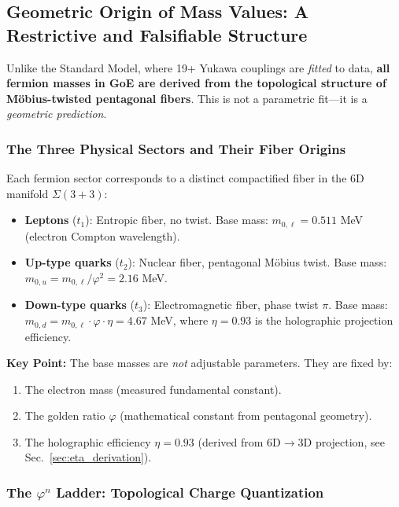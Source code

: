 \documentclass[12pt]{article}
\begin{document}
\subsection{Geometric Origin of Mass Values: A Restrictive and Falsifiable Structure}
\label{sec:geometric_origin}

Unlike the Standard Model, where 19+ Yukawa couplings are \textit{fitted} to data, \textbf{all fermion masses in GoE are derived from the topological structure of M\"obius-twisted pentagonal fibers}. This is not a parametric fit—it is a \textit{geometric prediction}.

\subsubsection{The Three Physical Sectors and Their Fiber Origins}

Each fermion sector corresponds to a distinct compactified fiber in the 6D manifold $\Sigma(3+3)$:

\begin{itemize}
\item \textbf{Leptons} ($t_1$): Entropic fiber, no twist. Base mass: $m_{0,\ell} = 0.511$ MeV (electron Compton wavelength).
\item \textbf{Up-type quarks} ($t_2$): Nuclear fiber, pentagonal M\"obius twist. Base mass: $m_{0,u} = m_{0,\ell}/\varphi^2 = 2.16$ MeV.
\item \textbf{Down-type quarks} ($t_3$): Electromagnetic fiber, phase twist $\pi$. Base mass: $m_{0,d} = m_{0,\ell} \cdot \varphi \cdot \eta = 4.67$ MeV, where $\eta = 0.93$ is the holographic projection efficiency.
\end{itemize}

\textbf{Key Point:} The base masses are \textit{not} adjustable parameters. They are fixed by:
\begin{enumerate}
\item The electron mass (measured fundamental constant).
\item The golden ratio $\varphi$ (mathematical constant from pentagonal geometry).
\item The holographic efficiency $\eta = 0.93$ (derived from 6D$\to$3D projection, see Sec.~\ref{sec:eta_derivation}).
\end{enumerate}

\subsubsection{The $\varphi^n$ Ladder: Topological Charge Quantization}
\end{document}

